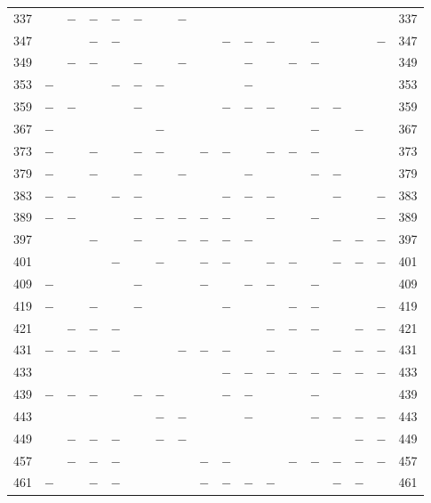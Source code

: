 \begin{center}
\begin{tabular}{r|c|c|c|c|c|c|c|c|c|c|c|c|c|c|c|c|r}
337 &  & $-$ & $-$ & $-$ & $-$ &  & $-$ &  &  &  &  &  &  &  &  &  & 337\\
347 &  &  & $-$ & $-$ &  &  &  &  & $-$ & $-$ & $-$ &  & $-$ &  &  & $-$ & 347\\
349 &  & $-$ & $-$ &  & $-$ &  & $-$ &  &  & $-$ &  & $-$ & $-$ &  &  &  & 349\\
353 & $-$ &  &  & $-$ & $-$ & $-$ &  &  &  & $-$ &  &  &  &  &  &  & 353\\
359 & $-$ & $-$ &  &  & $-$ &  &  &  & $-$ & $-$ & $-$ &  & $-$ & $-$ &  &  & 359\\
367 & $-$ &  &  &  &  & $-$ &  &  &  &  &  &  & $-$ &  & $-$ &  & 367\\
373 & $-$ &  & $-$ &  & $-$ & $-$ &  & $-$ & $-$ &  & $-$ & $-$ & $-$ &  &  &  & 373\\
379 & $-$ &  & $-$ &  & $-$ &  & $-$ &  &  & $-$ &  &  & $-$ & $-$ &  &  & 379\\
383 & $-$ & $-$ &  & $-$ & $-$ &  &  &  & $-$ & $-$ & $-$ &  &  & $-$ &  & $-$ & 383\\
389 & $-$ & $-$ &  &  & $-$ & $-$ & $-$ & $-$ & $-$ &  & $-$ &  & $-$ &  &  & $-$ & 389\\
397 &  &  & $-$ &  & $-$ &  & $-$ & $-$ & $-$ & $-$ &  &  &  & $-$ & $-$ & $-$ & 397\\
401 &  &  &  & $-$ &  & $-$ &  & $-$ & $-$ &  & $-$ & $-$ &  & $-$ & $-$ & $-$ & 401\\
409 & $-$ &  &  &  & $-$ &  &  & $-$ &  & $-$ & $-$ &  & $-$ &  &  &  & 409\\
419 & $-$ &  & $-$ &  & $-$ &  &  &  & $-$ &  &  & $-$ & $-$ &  &  & $-$ & 419\\
421 &  & $-$ & $-$ & $-$ &  &  &  &  &  &  & $-$ & $-$ & $-$ &  & $-$ & $-$ & 421\\
431 & $-$ & $-$ & $-$ & $-$ &  &  & $-$ & $-$ & $-$ &  & $-$ &  &  & $-$ & $-$ & $-$ & 431\\
433 &  &  &  &  &  &  &  &  & $-$ & $-$ & $-$ & $-$ & $-$ & $-$ & $-$ & $-$ & 433\\
439 & $-$ & $-$ & $-$ &  & $-$ & $-$ &  &  & $-$ & $-$ &  &  & $-$ &  &  &  & 439\\
443 &  &  &  &  &  & $-$ & $-$ &  &  & $-$ &  &  & $-$ & $-$ & $-$ & $-$ & 443\\
449 &  & $-$ & $-$ & $-$ &  & $-$ & $-$ &  &  &  &  &  &  &  & $-$ & $-$ & 449\\
457 &  & $-$ & $-$ & $-$ &  &  &  & $-$ & $-$ &  &  & $-$ & $-$ & $-$ & $-$ & $-$ & 457\\
461 & $-$ &  & $-$ & $-$ &  &  &  & $-$ & $-$ & $-$ & $-$ &  &  & $-$ & $-$ &  & 461\\

\end{tabular}
\end{center}
